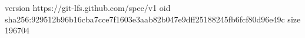 version https://git-lfs.github.com/spec/v1
oid sha256:929512b96b16cba7cce7f1603e3aab82b047e9dff25188245fb6fcf80d96e49c
size 196704
